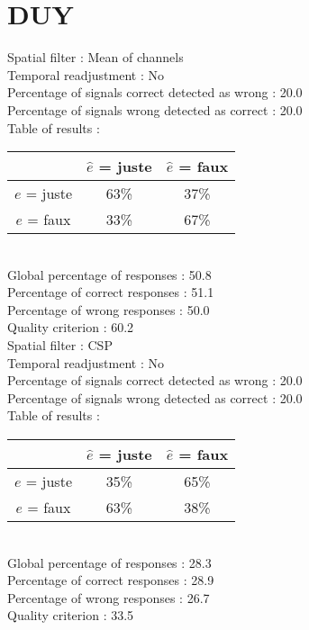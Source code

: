 \section*{DUY}
Spatial filter : Mean of channels \\
Temporal readjustment : No \\
Percentage of signals correct detected as wrong :   20.0 \\
Percentage of signals wrong detected as correct :   20.0 \\
Table of results : \\
\begin{tabular}{|c|c|c|}
\hline				& $\hat{e}$ = juste & $\hat{e}$ = faux \\
\hline  $e$ = juste	&     63\%			&     37\%		\\
\hline  $e$ = faux	&     33\%			&     67\%		\\
\hline
\end{tabular}\\
Global percentage of responses :   50.8 \\
Percentage of correct responses :   51.1 \\
Percentage of wrong responses :   50.0 \\
Quality criterion :   60.2 \\

Spatial filter : CSP \\
Temporal readjustment : No \\
Percentage of signals correct detected as wrong :   20.0 \\
Percentage of signals wrong detected as correct :   20.0 \\
Table of results : \\
\begin{tabular}{|c|c|c|}
\hline				& $\hat{e}$ = juste & $\hat{e}$ = faux \\
\hline  $e$ = juste	&     35\%			&     65\%		\\
\hline  $e$ = faux	&     63\%			&     38\%		\\
\hline
\end{tabular}\\
Global percentage of responses :   28.3 \\
Percentage of correct responses :   28.9 \\
Percentage of wrong responses :   26.7 \\
Quality criterion :   33.5 \\

